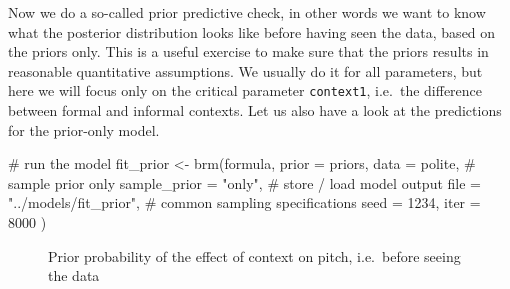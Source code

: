 \documentclass[
  doc,
  floatsintext,
  longtable,
  nolmodern,
  notxfonts,
  notimes,
  colorlinks=true,linkcolor=blue,citecolor=blue,urlcolor=blue]{apa7}
\newenvironment{Shaded}{\begin{snugshade}}{\end{snugshade}}
\newcommand{\AttributeTok}[1]{\textcolor[rgb]{0.40,0.45,0.13}{#1}}
\newcommand{\CommentTok}[1]{\textcolor[rgb]{0.37,0.37,0.37}{#1}}
\newcommand{\DecValTok}[1]{\textcolor[rgb]{0.68,0.00,0.00}{#1}}
\newcommand{\FunctionTok}[1]{\textcolor[rgb]{0.28,0.35,0.67}{#1}}
\newcommand{\NormalTok}[1]{\textcolor[rgb]{0.00,0.23,0.31}{#1}}
\newcommand{\OtherTok}[1]{\textcolor[rgb]{0.00,0.23,0.31}{#1}}
\newcommand{\StringTok}[1]{\textcolor[rgb]{0.13,0.47,0.30}{#1}}
\begin{document}
Now we do a so-called prior predictive check, in other words we want to
know what the posterior distribution looks like before having seen the
data, based on the priors only. This is a useful exercise to make sure
that the priors results in reasonable quantitative assumptions. We
usually do it for all parameters, but here we will focus only on the
critical parameter \texttt{context1}, i.e.~the difference between formal
and informal contexts. Let us also have a look at the predictions for
the prior-only model.

\begin{Shaded}
\begin{Highlighting}[]
\CommentTok{\# run the model}
\NormalTok{fit\_prior }\OtherTok{\textless{}{-}} \FunctionTok{brm}\NormalTok{(formula, }\AttributeTok{prior =}\NormalTok{ priors, }\AttributeTok{data =}\NormalTok{ polite,}
           \CommentTok{\# sample prior only}
           \AttributeTok{sample\_prior =} \StringTok{"only"}\NormalTok{,}
           \CommentTok{\# store / load model output}
           \AttributeTok{file  =} \StringTok{"../models/fit\_prior"}\NormalTok{,}
           \CommentTok{\# common sampling specifications}
           \AttributeTok{seed =} \DecValTok{1234}\NormalTok{, }\AttributeTok{iter =} \DecValTok{8000}
\NormalTok{           )}
\end{Highlighting}
\end{Shaded}

\begin{figure}[!tbp]

\caption{\label{fig-plot-priors}Prior probability of the effect of
context on pitch, i.e.~before seeing the data}


\end{figure}%
\end{document}
